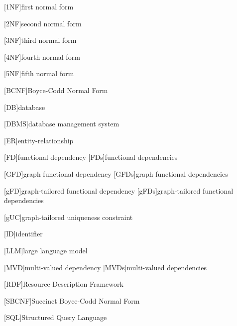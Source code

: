 \begin{acronym}

[1NF]{first normal form}

[2NF]{second normal form}

[3NF]{third normal form}

[4NF]{fourth normal form}

[5NF]{fifth normal form}

[BCNF]{Boyce-Codd Normal Form}

[DB]{database}

[DBMS]{database management system}

[ER]{entity-relationship}

[FD]{functional dependency}
[FDs]{functional dependencies}

[GFD]{graph functional dependency}
[GFDs]{graph functional dependencies}

[gFD]{graph-tailored functional dependency}
[gFDs]{graph-tailored functional dependencies}

[gUC]{graph-tailored uniqueness constraint}

[ID]{identifier}

[LLM]{large language model}

[MVD]{multi-valued dependency}
[MVDs]{multi-valued dependencies}

[RDF]{Resource Description Framework}

[SBCNF]{Succinct Boyce-Codd Normal Form} %

[SQL]{Structured Query Language}

\end{acronym}
